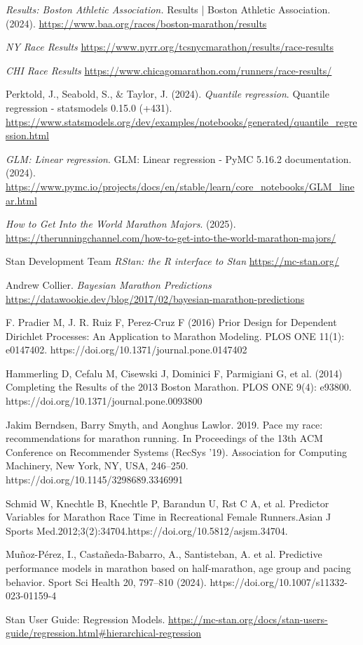 \documentclass[USenglish,twocolumn]{article}
\theoremstyle{dgthm}
\theoremstyle{dgdef}
\begin{document}
\begin{thebibliography}{9}
\emph{Results: Boston Athletic Association.} Results | Boston Athletic Association. (2024). \url{https://www.baa.org/races/boston-marathon/results}

\emph{NY Race Results}  \url{https://www.nyrr.org/tcsnycmarathon/results/race-results}

\emph{CHI Race Results} \url{https://www.chicagomarathon.com/runners/race-results/}

Perktold, J., Seabold, S., \& Taylor, J. (2024). \emph{Quantile regression}. Quantile regression 
- statsmodels 0.15.0 (+431). \url{https://www.statsmodels.org/dev/examples/notebooks/generated/quantile_regression.html}

\emph{GLM: Linear regression}. GLM: Linear regression - PyMC 5.16.2 documentation. (2024). \url{https://www.pymc.io/projects/docs/en/stable/learn/core_notebooks/GLM_linear.html} 

\emph{How to Get Into the World Marathon Majors}.  (2025). \url{https://therunningchannel.com/how-to-get-into-the-world-marathon-majors/} 

Stan Development Team \emph{RStan: the R interface to Stan} \url{https://mc-stan.org/}

Andrew Collier. \emph{Bayesian Marathon Predictions} \url{https://datawookie.dev/blog/2017/02/bayesian-marathon-predictions}

F. Pradier M, J. R. Ruiz F, Perez-Cruz F (2016) Prior Design for Dependent Dirichlet Processes: An Application to Marathon Modeling. PLOS ONE 11(1): e0147402. https://doi.org/10.1371/journal.pone.0147402

Hammerling D, Cefalu M, Cisewski J, Dominici F, Parmigiani G, et al. (2014) Completing the Results of the 2013 Boston Marathon. PLOS ONE 9(4): e93800. https://doi.org/10.1371/journal.pone.0093800

Jakim Berndsen, Barry Smyth, and Aonghus Lawlor. 2019. Pace my race: recommendations for marathon running. In Proceedings of the 13th ACM Conference on Recommender Systems (RecSys '19). Association for Computing Machinery, New York, NY, USA, 246–250. https://doi.org/10.1145/3298689.3346991

Schmid W, Knechtle B, Knechtle P, Barandun U, Rst C A, et al. Predictor Variables for Marathon Race Time in Recreational Female Runners.Asian J Sports Med.2012;3(2):34704.https://doi.org/10.5812/asjsm.34704.

Muñoz-Pérez, I., Castañeda-Babarro, A., Santisteban, A. et al. Predictive performance models in marathon based on half-marathon, age group and pacing behavior. Sport Sci Health 20, 797–810 (2024). https://doi.org/10.1007/s11332-023-01159-4

Stan User Guide: Regression Models. \url{https://mc-stan.org/docs/stan-users-guide/regression.html#hierarchical-regression}


\end{thebibliography}
\end{document}
